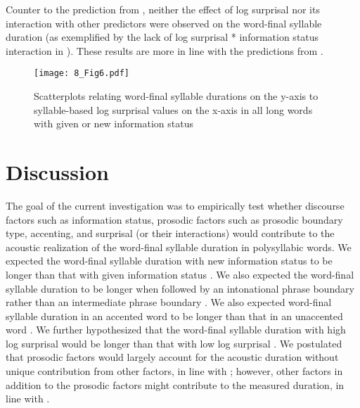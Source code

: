 \documentclass[output=paper,colorlinks,citecolor=brown]{langscibook}
\begin{document}
Counter to the prediction from \citet{Baker2009}, neither the effect of log surprisal nor its interaction with other predictors were observed on the word-final syllable duration (as exemplified by the lack of log surprisal * information status interaction in ). These results are more in line with the predictions from \citet{Aylett2004}.

\begin{figure}
\texttt{[image: 8\_Fig6.pdf]}
\caption{Scatterplots relating word-final syllable durations on the y-axis to syllable-based log surprisal values on the x-axis in all long words with given or new information status}
\label{fig6}
\end{figure}

\section{Discussion}
The goal of the current investigation was to empirically test whether discourse factors such as information status, prosodic factors such as prosodic boundary type, accenting, and surprisal (or their interactions) would contribute to the acoustic realization of the word-final syllable duration in polysyllabic words. We expected the word-final syllable duration with new information status to be longer than that with given information status \citep[e.g.,][]{Fowler1987, Lam2010}. We also expected the word-final syllable duration to be longer when followed by an intonational phrase boundary rather than an intermediate phrase boundary \citep[e.g.,][]{Wightman1992}. We also expected word-final syllable duration in an accented word to be longer than that in an unaccented word \citep[e.g.,][]{Turk1999}. We further hypothesized that the word-final syllable duration with high log surprisal would be longer than that with low log surprisal \citep[e.g.,][]{Ibrahim2022}. We postulated that prosodic factors would largely account for the acoustic duration without unique contribution from other factors, in line with \citet{Aylett2004}; however, other factors in addition to the prosodic factors might contribute to the measured duration, in line with \citet{Baker2009}. 
\end{document}
